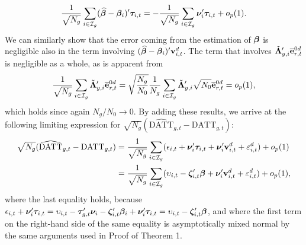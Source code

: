 \documentclass[12pt,fleqn]{article}
\begin{document}
\begin{align}
\frac{1}{\sqrt{N_g}} \sum_{i\in \mathcal{I}_g} (\widehat{\boldsymbol{\beta}}-\boldsymbol{\beta}_i)'\boldsymbol{\tau}_{i,t} = -\frac{1}{\sqrt{N_g}} \sum_{i\in \mathcal{I}_g} \boldsymbol{\nu}_i'\boldsymbol{\tau}_{i,t} + o_p(1).
\end{align}
We can similarly show that the error coming from the estimation of $\boldsymbol{\beta}$ is negligible also in the term involving  $(\widehat{\boldsymbol{\beta}}-\boldsymbol{\beta}_i)'\mathbf{v}_{i,t}^d$. The term that involves $\tilde{\boldsymbol{\Lambda}}_{y,i}'\overline{\mathbf{e}}_{r,t}^{0d}$ is negligible as a whole, as is apparent from
\begin{align}
\frac{1}{\sqrt{N_g}} \sum_{i\in \mathcal{I}_g} \tilde{\boldsymbol{\Lambda}}_{y,i}'\overline{\mathbf{e}}_{r,t}^{0d} = \sqrt{\frac{N_g}{N_0}}\frac{1}{N_g} \sum_{i\in \mathcal{I}_g} \tilde{\boldsymbol{\Lambda}}_{y,i}'\sqrt{N_0}\overline{\mathbf{e}}_{r,t}^{0d} = o_p(1),
\end{align}
which holds since again $N_g/N_0\to 0$. By adding these results, we arrive at the following limiting expression for $\sqrt{N_g}(\widehat{\mathrm{DATT}}_{g,t}- \mathrm{DATT}_{g,t})$:
\begin{align}
\sqrt{N_g}(\widehat{\mathrm{DATT}}_{g,t} - \mathrm{DATT}_{g,t}) & = \frac{1}{\sqrt{N_g}} \sum_{i\in \mathcal{I}_g} (\epsilon_{i,t} +\boldsymbol{\nu}_i'\boldsymbol{\tau}_{i,t} + \boldsymbol{\nu}_i'\mathbf{v}_{i,t}^d + \varepsilon_{i,t}^d ) + o_p(1) \notag\\
& = \frac{1}{\sqrt{N_g}} \sum_{i\in \mathcal{I}_g} (\upsilon_{i,t} - \boldsymbol{\zeta}_{i,t}'\boldsymbol{\beta} + \boldsymbol{\nu}_i'\mathbf{v}_{i,t}^d + \varepsilon_{i,t}^d ) + o_p(1),
\end{align}
where the last equality holds, because $\epsilon_{i,t} +\boldsymbol{\nu}_i'\boldsymbol{\tau}_{i,t} = \upsilon_{i,t}- \boldsymbol{\tau}_{g,t}'\boldsymbol{\nu}_i - \boldsymbol{\zeta}_{i,t}'\boldsymbol{\beta}_i +\boldsymbol{\nu}_i'\boldsymbol{\tau}_{i,t} = \upsilon_{i,t} - \boldsymbol{\zeta}_{i,t}'\boldsymbol{\beta}$, and where the first term on the right-hand side of the same equality is asymptotically mixed normal by the same arguments used in Proof of Theorem 1.
\end{document}
